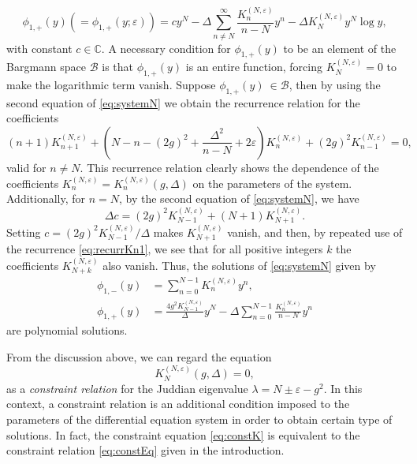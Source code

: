 \documentclass[11pt]{article}
\numberwithin{equation}{section}
\newcommand{\C}{\mathbb{C}} %
\newcommand{\e}{\varepsilon}
\newcommand{\Bargmann}{\mathcal{B}}
\theoremstyle{plain}
\theoremstyle{definition}
\theoremstyle{remark}
\begin{document}
\begin{equation}\label{LogTermFrobenius}
  \phi_{1,+}(y) (=\phi_{1,+}(y;\e))
  = c y^N - \Delta \sum_{n \neq N}^\infty \frac{K^{(N,\e)}_n}{n-N} y^n - \Delta K^{(N,\e)}_N y^N \log y,
\end{equation}
with constant \(c \in \C \). A necessary condition for \(\phi_{1,+}(y)\) to be an element of the Bargmann space \(\Bargmann\) is that
\(\phi_{1,+}(y)\) is an entire function, forcing \(K_N^{(N,\e)} = 0\) to make the logarithmic term vanish. Suppose \(\phi_{1,+}(y)\ \in \Bargmann\),
then by using the second equation of \eqref{eq:systemN} we obtain the recurrence relation for the coefficients
\begin{equation}\label{eq:recurrKn1}
  (n+1) K^{(N,\e)}_{n+1} + \left(N-n - (2g)^2 + \frac{\Delta^2}{n-N} + 2\e \right) K^{(N,\e)}_n + (2g)^2 K^{(N,\e)}_{n-1} = 0,
\end{equation}
valid for \(n \not= N\). This recurrence relation clearly shows the dependence of the coefficients \(K^{(N,\e)}_n = K^{(N,\e)}_n(g,\Delta)\)
on the parameters of the system. Additionally, for \( n = N \), by the second equation of \eqref{eq:systemN}, we have
\begin{equation}\label{eq:constant}
 \Delta c = (2g)^2 K^{(N,\e)}_{N-1} + (N+1) K^{(N,\e)}_{N+1}.
\end{equation}
Setting \( c = (2g)^2 K^{(N,\e)}_{N-1} / \Delta \) makes \( K^{(N,\e)}_{N+1}\) vanish, and then, by repeated use of the recurrence
\eqref{eq:recurrKn1}, we see that for all positive integers \(k\) the coefficients \(K^{(N,\e)}_{N+k}\) also vanish.
Thus, the solutions of \eqref{eq:systemN} given by
\begin{align}\label{eq:polynomial_sol}
    \phi_{1,-}(y) &= \sum_{n=0}^{N-1} K^{(N,\e)}_n y^n, \\
    \phi_{1,+}(y) &= \frac{4 g^2 K^{(N,\e)}_{N-1}}{\Delta} y^N - \Delta \sum_{n=0}^{N-1} \frac{K^{(N,\e)}_n}{n-N} y^n
\end{align}
are polynomial solutions.


From the discussion above, we can regard the equation
\begin{equation}
  \label{eq:constK}
  K_N^{(N,\e)}(g,\Delta) = 0,
\end{equation}
as a {\em constraint relation} for the Juddian eigenvalue \(\lambda = N \pm \e - g^2\). In this context, a constraint
relation is an additional condition imposed to the parameters of the differential equation system in order to obtain
certain type of solutions. In fact, the constraint equation \eqref{eq:constK} is equivalent to the constraint relation \eqref{eq:constEq} given in the introduction.
\end{document}

